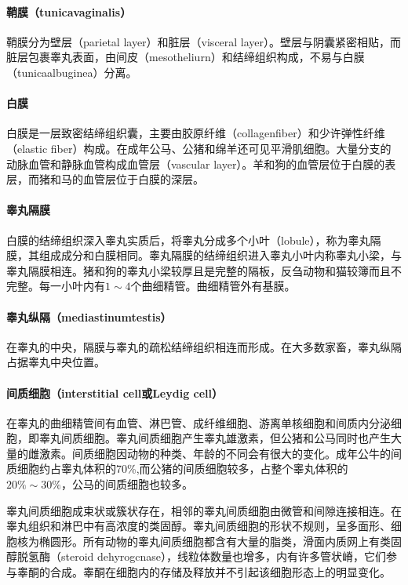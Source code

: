 \paragraph{鞘膜（tunicavaginalis）}

鞘膜分为壁层（parietal layer）和脏层（visceral layer）。壁层与阴囊紧密相贴，而脏层包裹睾丸表面，由间皮（mesotheliurn）和结缔组织构成，不易与白膜（tunicaalbug­inea）分离。

\paragraph{白膜}

白膜是一层致密结缔组织囊，主要由胶原纤维（collagenfiber）和少许弹性纤维（elastic fiber）构成。在成年公马、公猪和绵羊还可见平滑肌细胞。大量分支的动脉血管和静脉血管构成血管层（vascular layer）。羊和狗的血管层位于白膜的表层，而猪和马的血管层位于白膜的深层。

\paragraph{睾丸隔膜}

白膜的结缔组织深入睾丸实质后，将睾丸分成多个小叶（lobule），称为睾丸隔膜，其组成成分和白膜相同。睾丸隔膜的结缔组织进入睾丸小叶内称睾丸小梁，与睾丸隔膜相连。猪和狗的睾丸小梁较厚且是完整的隔板，反刍动物和猫较簿而且不完整。每一小叶内有$ 1\sim 4 $个曲细精管。曲细精管外有基膜。

\paragraph{睾丸纵隔（mediastinumtestis）}

在睾丸的中央，隔膜与睾丸的疏松结缔组织相连而形成。在大多数家畜，睾丸纵隔占据睾丸中央位置。

\paragraph{间质细胞（interstitial cell或Leydig cell）}

在睾丸的曲细精管间有血管、淋巴管、成纤维细胞、游离单核细胞和间质内分泌细胞，即睾丸间质细胞。睾丸间质细胞产生睾丸雄激素，但公猪和公马同时也产生大量的雌激素。间质细胞因动物的种类、年龄的不同会有很大的变化。成年公牛的间质细胞约占睾丸体积的70\%,而公猪的间质细胞较多，占整个睾丸体积的$ 20\%\sim30\% $，公马的间质细胞也较多。

睾丸间质细胞成束状或簇状存在，相邻的睾丸间质细胞由微管和间隙连接相连。在睾丸组织和淋巴中有高浓度的类固醇。睾丸间质细胞的形状不规则，呈多面形、细胞核为椭圆形。所有动物的睾丸间质细胞都含有大量的脂类，滑面内质网上有类固醇脱氢酶（steroid dehyrogcnase），线粒体数量也增多，内有许多管状嵴，它们参与睾酮的合成。睾酮在细胞内的存储及释放并不引起该细胞形态上的明显变化。

